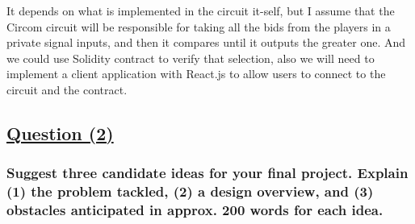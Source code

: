 \documentclass[letterpaper, 10 pt, conference]{ieeeconf}  %
\begin{document}
It depends on what is implemented in the circuit it-self, but I assume that the Circom circuit will be responsible for taking all the bids from the players in a private signal inputs, and then it compares until it outputs the greater one. And we could use Solidity contract to verify that selection, also we will need to implement a client application with React.js to allow users to connect to the circuit and the contract.

\subsection{\textbf{\underline{Question (2)}}}
\subsubsection{\textbf{Suggest three candidate ideas for your final project. Explain (1) the problem tackled, (2) a design overview, and (3) obstacles anticipated in approx. 200 words for each idea.}}
\end{document}
